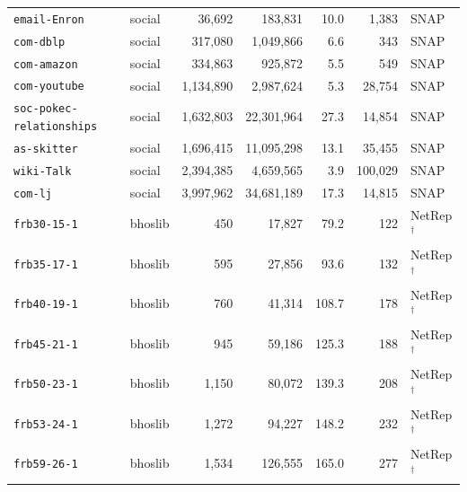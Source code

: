 \begin{longtable}{l l r r r r l}
\texttt{email-Enron} & social & 36,692 & 183,831 & 10.0 & 1,383 & SNAP \\
\texttt{com-dblp} & social & 317,080 & 1,049,866 & 6.6 & 343 & SNAP \\
\texttt{com-amazon} & social & 334,863 & 925,872 & 5.5 & 549 & SNAP \\
\texttt{com-youtube} & social & 1,134,890 & 2,987,624 & 5.3 & 28,754 & SNAP \\
\texttt{soc-pokec-relationships} & social & 1,632,803 & 22,301,964 & 27.3 & 14,854 & SNAP \\
\texttt{as-skitter} & social & 1,696,415 & 11,095,298 & 13.1 & 35,455 & SNAP \\
\texttt{wiki-Talk} & social & 2,394,385 & 4,659,565 & 3.9 & 100,029 & SNAP \\
\texttt{com-lj} & social & 3,997,962 & 34,681,189 & 17.3 & 14,815 & SNAP \\
\texttt{frb30-15-1} & bhoslib & 450 & 17,827 & 79.2 & 122 & NetRep$^{\dagger}$ \\
\texttt{frb35-17-1} & bhoslib & 595 & 27,856 & 93.6 & 132 & NetRep$^{\dagger}$ \\
\texttt{frb40-19-1} & bhoslib & 760 & 41,314 & 108.7 & 178 & NetRep$^{\dagger}$ \\
\texttt{frb45-21-1} & bhoslib & 945 & 59,186 & 125.3 & 188 & NetRep$^{\dagger}$ \\
\texttt{frb50-23-1} & bhoslib & 1,150 & 80,072 & 139.3 & 208 & NetRep$^{\dagger}$ \\
\texttt{frb53-24-1} & bhoslib & 1,272 & 94,227 & 148.2 & 232 & NetRep$^{\dagger}$ \\
\texttt{frb59-26-1} & bhoslib & 1,534 & 126,555 & 165.0 & 277 & NetRep$^{\dagger}$ \\
\end{longtable}
\setlength{\tabcolsep}{6pt}
\normalsize

